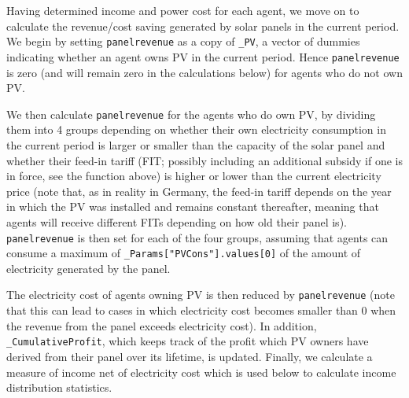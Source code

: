 \documentclass[
  letterpaper,
  DIV=11,
  numbers=noendperiod]{scrartcl}
\begin{document}
Having determined income and power cost for each agent, we move on to
calculate the revenue/cost saving generated by solar panels in the
current period. We begin by setting \texttt{panelrevenue} as a copy of
\texttt{\_PV}, a vector of dummies indicating whether an agent owns PV
in the current period. Hence \texttt{panelrevenue} is zero (and will
remain zero in the calculations below) for agents who do not own PV.

We then calculate \texttt{panelrevenue} for the agents who do own PV, by
dividing them into 4 groups depending on whether their own electricity
consumption in the current period is larger or smaller than the capacity
of the solar panel and whether their feed-in tariff (FIT; possibly
including an additional subsidy if one is in force, see the function
above) is higher or lower than the current electricity price (note that,
as in reality in Germany, the feed-in tariff depends on the year in
which the PV was installed and remains constant thereafter, meaning that
agents will receive different FITs depending on how old their panel is).
\texttt{panelrevenue} is then set for each of the four groups, assuming
that agents can consume a maximum of
\texttt{\_Params{[}"PVCons"{]}.values{[}0{]}} of the amount of
electricity generated by the panel.

The electricity cost of agents owning PV is then reduced by
\texttt{panelrevenue} (note that this can lead to cases in which
electricity cost becomes smaller than 0 when the revenue from the panel
exceeds electricity cost). In addition, \texttt{\_CumulativeProfit},
which keeps track of the profit which PV owners have derived from their
panel over its lifetime, is updated. Finally, we calculate a measure of
income net of electricity cost which is used below to calculate income
distribution statistics.
\end{document}
